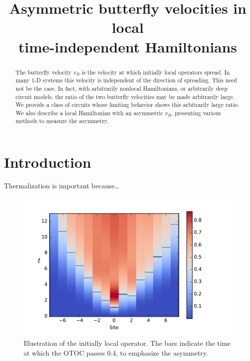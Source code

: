 \documentclass[aps,prl,reprint,superscriptaddress, longbibliography]{revtex4-1}
\begin{document}
\title{Asymmetric butterfly velocities in local\\ time-independent Hamiltonians
} 
%

\begin{abstract}
The butterfly velocity $v_B$ is the velocity at which initially local operators spread. In many 1-D systems this velocity is independent of the direction of spreading. This need not be the case. In fact, with arbitrarily nonlocal Hamiltonians, or arbitrarily deep circuit models, the ratio of the two butterfly velocities may be made arbitrarily large. We provide a class of circuits whose limiting behavior shows this arbitrarily large ratio. We also describe a local Hamiltonian with an asymmetric $v_B$, presenting various methods to measure the asymmetry.
\end{abstract}

\maketitle

\section{Introduction}

Thermalization is important because\dots

\begin{figure}
	\includegraphics[width=\columnwidth]{colorplot}
	\caption{Illustration of the initially local operator. The bars indicate the time at which the OTOC passes 0.4, to emphasize the asymmetry.}
	\label{fig:colorplot}
\end{figure}
\end{document}
